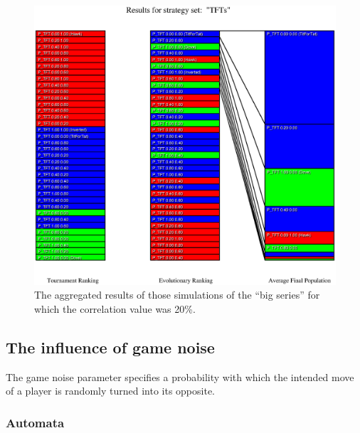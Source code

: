 \begin{figure}
\begin{center}
\includegraphics[width=20cm]{tables/TFTs_C0.200.eps}
\caption{\label{TFTs_C0200} The aggregated results of those
simulations of the ``big series'' for which the correlation value was 20\%.}
\end{center}
\end{figure}


\newpage
\subsection{The influence of game noise}

The game noise parameter specifies a probability with which the
intended move of a player is randomly turned into its opposite.

\subsubsection{Automata}


